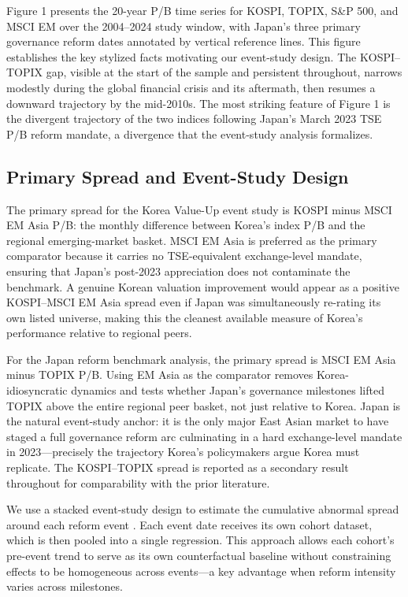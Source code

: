 Figure 1 presents the 20-year P/B time series for KOSPI, TOPIX, S\&P 500, and MSCI EM over the 2004--2024 study window, with Japan's three primary governance reform dates annotated by vertical reference lines. This figure establishes the key stylized facts motivating our event-study design. The KOSPI--TOPIX gap, visible at the start of the sample and persistent throughout, narrows modestly during the global financial crisis and its aftermath, then resumes a downward trajectory by the mid-2010s. The most striking feature of Figure 1 is the divergent trajectory of the two indices following Japan's March 2023 TSE P/B reform mandate, a divergence that the event-study analysis formalizes.

\subsection{Primary Spread and Event-Study Design}

The primary spread for the Korea Value-Up event study is KOSPI minus MSCI EM Asia P/B: the monthly difference between Korea's index P/B and the regional emerging-market basket. MSCI EM Asia is preferred as the primary comparator because it carries no TSE-equivalent exchange-level mandate, ensuring that Japan's post-2023 appreciation does not contaminate the benchmark. A genuine Korean valuation improvement would appear as a positive KOSPI--MSCI EM Asia spread even if Japan was simultaneously re-rating its own listed universe, making this the cleanest available measure of Korea's performance relative to regional peers.

For the Japan reform benchmark analysis, the primary spread is MSCI EM Asia minus TOPIX P/B. Using EM Asia as the comparator removes Korea-idiosyncratic dynamics and tests whether Japan's governance milestones lifted TOPIX above the entire regional peer basket, not just relative to Korea. Japan is the natural event-study anchor: it is the only major East Asian market to have staged a full governance reform arc culminating in a hard exchange-level mandate in 2023---precisely the trajectory Korea's policymakers argue Korea must replicate. The KOSPI--TOPIX spread is reported as a secondary result throughout for comparability with the prior literature.

We use a stacked event-study design to estimate the cumulative abnormal spread around each reform event \citep{cengiz_stacked_did_2019}. Each event date receives its own cohort dataset, which is then pooled into a single regression. This approach allows each cohort's pre-event trend to serve as its own counterfactual baseline without constraining effects to be homogeneous across events---a key advantage when reform intensity varies across milestones.

